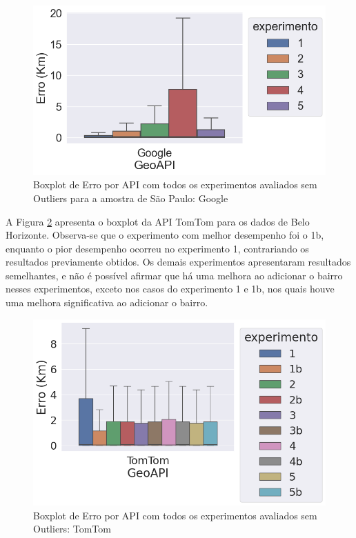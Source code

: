 \begin{figure}[h]
  \centering
  \includegraphics[width=\textwidth]{Figuras/boxplotApiGoogleSemOutsp.png}
  \caption{Boxplot de Erro por API com todos os experimentos avaliados sem Outliers para a amostra de São Paulo: Google}
  \label{fig:boxplot-api-google-semout-sp}
\end{figure}

A Figura \ref{fig:boxplot-api-tomtom-semout-bh} apresenta o boxplot da API TomTom para os dados de Belo Horizonte. Observa-se que o experimento com melhor desempenho foi o 1b, enquanto o pior desempenho ocorreu no experimento 1, contrariando os resultados previamente obtidos. Os demais experimentos apresentaram resultados semelhantes, e não é possível afirmar que há uma melhora ao adicionar o bairro nesses experimentos, exceto nos casos do experimento 1 e 1b, nos quais houve uma melhora significativa ao adicionar o bairro.

\begin{figure}[h]
    \centering
    \includegraphics[width=\textwidth]{Figuras/boxplotApiTomtomSemOut.png}
    \caption{Boxplot de Erro por API com todos os experimentos avaliados sem Outliers: TomTom}
    \label{fig:boxplot-api-tomtom-semout-bh}
\end{figure}

